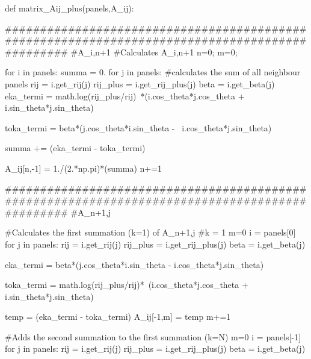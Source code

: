 \documentclass[a4paper,12pt]{article}
\begin{document}
\begin{python}
def matrix_Aij_plus(panels,A_ij):
        
        ###############################################################################################
                                                 #A_i,n+1
        #Calculates A_i,n+1
        n=0; m=0;

        for i in panels:               
                summa = 0.            
                for j in panels:
                        #calculates the sum of all neighbour panels                        
                        rij = i.get_rij(j)
                        rij_plus = i.get_rij_plus(j)
                        beta = i.get_beta(j)                        
                        eka_termi = math.log(rij_plus/rij)\
		     	 	*(i.cos_theta*j.cos_theta + i.sin_theta*j.sin_theta)
                        
                        toka_termi = beta*(j.cos_theta*i.sin_theta - \
                              i.cos_theta*j.sin_theta)
                         
                        summa += (eka_termi - toka_termi)
                            

                A_ij[n,-1] = 1./(2.*np.pi)*(summa)
                n+=1
        

        ###############################################################################################
                                                 #A_n+1,j

        #Calculates the first summation (k=1) of A_n+1,j
        #k = 1
        m=0
        i = panels[0]        
        for j in panels:
                rij = i.get_rij(j)
                rij_plus = i.get_rij_plus(j)
                beta = i.get_beta(j)                        

                eka_termi = beta*(j.cos_theta*i.sin_theta - i.cos_theta*j.sin_theta)

                toka_termi = math.log(rij_plus/rij)*\
                           (i.cos_theta*j.cos_theta + i.sin_theta*j.sin_theta)
                
                temp = (eka_termi - toka_termi)
                A_ij[-1,m] = temp
                m+=1

        #Adds the second summation to the first summation (k=N)
        m=0
        i = panels[-1]       
        for j in panels:
                rij = i.get_rij(j)
                rij_plus = i.get_rij_plus(j)
                beta = i.get_beta(j)                        


\end{python}
\end{document}
